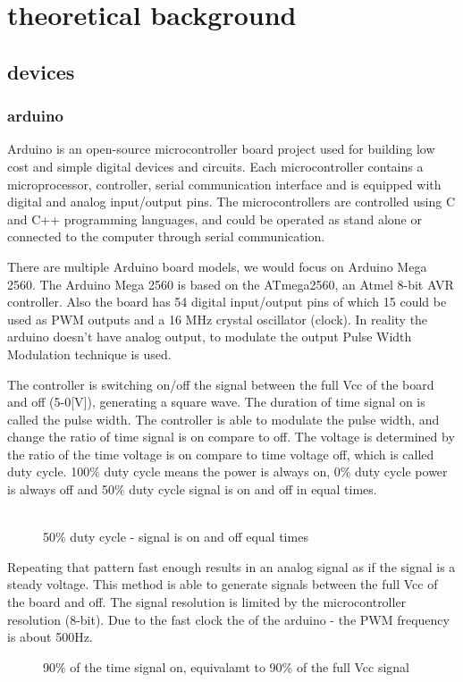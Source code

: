 \documentclass[\main/master.tex]{subfiles}
\begin{document}
\chapter{theoretical background}\label{chp:example-2}
\section{devices}


\subsection{arduino}
Arduino is an open-source microcontroller board project used for building low cost and simple digital devices and circuits. Each microcontroller contains a microprocessor, controller, serial communication interface and is equipped with digital and analog input/output pins. The microcontrollers are controlled using C and C++ programming languages, and could be operated as stand alone or connected to the computer through serial communication. 
\par
There are multiple Arduino board models, we would focus on Arduino Mega 2560. The Arduino Mega 2560 is based on the ATmega2560, an Atmel 8-bit AVR controller. Also the board has 54 digital input/output pins of which 15 could be used as PWM outputs and a 16 MHz crystal oscillator (clock). In reality the arduino doesn't have analog output, to modulate the output Pulse Width Modulation technique is used.
\par
The controller is switching on/off the signal between the full Vcc of the board and off (5-0[V]), generating a square wave. The duration of time signal on is called the pulse width. The controller is able to modulate the pulse width, and change the ratio of time signal is on compare to off. The voltage is determined by the ratio of the time voltage is on compare to time voltage off, which is called duty cycle. 100\% duty cycle means the power is always on, 0\% duty cycle power is always off and 50\% duty cycle signal is on and off in equal times. 
\\
\\
\par

\begin{figure}[htbp]
	\centering
	\caption[duty cycle 50\%]{50\% duty cycle  - signal is on and off equal times}
	\label{fig:duty50}
\end{figure}
Repeating that pattern fast enough results in an analog signal as if the signal is a steady voltage. This method is able to generate signals between the full Vcc of the board and off. The signal resolution is limited by the microcontroller resolution (8-bit). Due to the fast clock the of the arduino - the PWM frequency is about 500Hz.
\par
\begin{figure}[htbp]
	\centering
	\caption[duty cycle 90\%]{90\% of the time signal on, equivalamt to 90\% of the full Vcc signal}
	\label{fig:duty90}
\end{figure}
\end{document}
